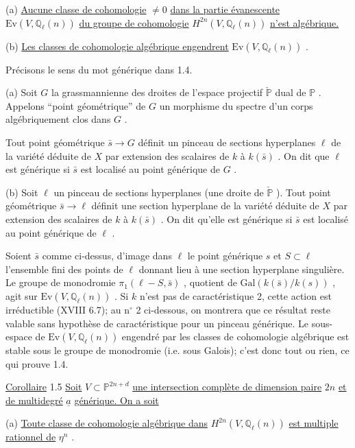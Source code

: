 (a) \underline{Aucune classe de cohomologie} $\neq 0$ \underline{dans la partie évanescente} $\mathrm{Ev}(V, \mathbb{Q}_\ell(n))$ \underline{du groupe de cohomologie} $H^{2n}(V, \mathbb{Q}_\ell(n))$ \underline{n'est algébrique.}

(b) \underline{Les classes de cohomologie algébrique engendrent} $\mathrm{Ev}(V, \mathbb{Q}_\ell(n))$ .

Précisons le sens du mot générique dans 1.4.

(a) Soit $G$ la grassmannienne des droites de l'espace projectif $\check{\mathbb{P}}$ dual de $\mathbb{P}$ . Appelons ``point géométrique'' de $G$ un morphisme du spectre d'un corps algébriquement clos dans $G$ .

Tout point géométrique $\bar{s} \to G$ définit un pinceau de sections hyperplanes $\ell$ de la variété déduite de $X$ par extension des scalaires de $k$ à $k(\bar{s})$ . On dit que $\ell$ est générique si $\bar{s}$ est localisé au point générique de $G$ .

(b) Soit $\ell$ un pinceau de sections hyperplanes (une droite de $\check{\mathbb{P}}$ ). Tout point géométrique $\bar{s} \to \ell$ définit une section hyperplane de la variété déduite de $X$ par extension des scalaires de $k$ à $k(\bar{s})$ . On dit qu'elle est générique si $\bar{s}$ est localisé au point générique de $\ell$ .

Soient $\bar{s}$ comme ci-dessus, d'image dans $\ell$ le point générique $s$ et $S \subset \ell$ l'ensemble fini des points de $\ell$ donnant lieu à une section hyperplane singulière. Le groupe de monodromie $\pi_1(\ell - S, \bar{s})$ , quotient de $\mathrm{Gal}(k(\bar{s})/k(s))$ , agit sur $\mathrm{Ev}(V, \mathbb{Q}_\ell(n))$ . Si $k$ n'est pas de caractéristique 2, cette action est irréductible (XVIII 6.7); au n$^{\circ}$ 2 ci-dessous, on montrera que ce résultat reste valable sans hypothèse de caractéristique pour un pinceau générique. Le sous-espace de $\mathrm{Ev}(V, \mathbb{Q}_\ell(n))$ engendré par les classes de cohomologie algébrique est stable sous le groupe de monodromie (i.e. sous Galois); c'est donc tout ou rien, ce qui prouve 1.4.



\underline{Corollaire} 1.5 \quad \underline{Soit} $V \subset \mathbb{P}^{2n+d}$ \underline{une intersection complète de dimension paire} $2n$ \underline{et de multidegré} $\underline{a}$ \underline{générique. On a soit}

(a) \underline{Toute classe de cohomologie algébrique dans} $H^{2n}(V, \mathbb{Q}_\ell(n))$ \underline{est multiple rationnel de} $\eta^n$ .

